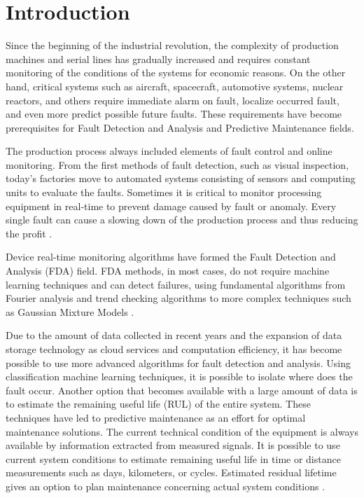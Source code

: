 \chapter{Introduction}
Since the beginning of the industrial revolution, the complexity of
production machines and serial lines has gradually increased and requires
constant monitoring of the conditions of the systems for economic reasons.
On the other hand, critical systems such as aircraft, spacecraft,
automotive systems, nuclear reactors, and others require immediate alarm on
fault, localize occurred fault, and even more predict possible future
faults.  These requirements have become prerequisites for Fault Detection
and Analysis and Predictive Maintenance fields.

The production process always included elements of fault control and online
monitoring. From the first methods of fault detection, such as visual
inspection, today's factories move to automated systems consisting of
sensors and computing units to evaluate the faults. Sometimes it is
critical to monitor processing equipment in real-time to prevent damage
caused by fault or anomaly. Every single fault can cause a slowing down of
the production process and thus reducing the profit \cite{state_of_art_pdm}.

Device real-time monitoring algorithms have formed the Fault Detection and
Analysis (FDA) field.  FDA methods, in most cases, do not require machine
learning techniques and can detect failures, using fundamental algorithms
from Fourier analysis and trend checking algorithms to more complex
techniques such as Gaussian Mixture Models \cite{isermann_fdi}.

Due to the amount of data collected in recent years and the expansion of
data storage technology as cloud services and computation efficiency, it
has become possible to use more advanced algorithms for fault detection and
analysis. Using classification machine learning techniques, it is possible
to isolate where does the fault occur.  Another option that becomes
available with a large amount of data is to estimate the remaining useful
life (RUL) of the entire system. These techniques have led to predictive
maintenance as an effort for optimal maintenance solutions. The current
technical condition of the equipment is always available by information
extracted from measured signals. It is possible to use current system
conditions to estimate remaining useful life in time or distance
measurements such as days, kilometers, or cycles. Estimated residual
lifetime gives an option to plan maintenance concerning actual system
conditions \cite{pdm_dyn_systems}.


